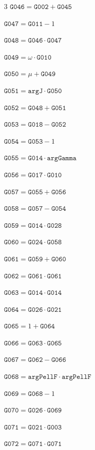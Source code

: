 \documentclass[10pt]{article}
\begin{document}
\begin{multicols}{3}
\noindent $\mathtt{G046}=\mathtt{G002}+\mathtt{G045}$\par
\noindent $\mathtt{G047}=\mathtt{G011}-1$\par
\noindent $\mathtt{G048}=\mathtt{G046}\cdot \mathtt{G047}$\par
\noindent $\mathtt{G049}=\omega\cdot \mathtt{G010}$\par
\noindent $\mathtt{G050}=\mu+\mathtt{G049}$\par
\noindent $\mathtt{G051}=\mathtt{argJ}\cdot \mathtt{G050}$\par
\noindent $\mathtt{G052}=\mathtt{G048}+\mathtt{G051}$\par
\noindent $\mathtt{G053}=\mathtt{G018}-\mathtt{G052}$\par
\noindent $\mathtt{G054}=\mathtt{G053}-1$\par
\noindent $\mathtt{G055}=\mathtt{G014}\cdot \mathtt{argGamma}$\par
\noindent $\mathtt{G056}=\mathtt{G017}\cdot \mathtt{G010}$\par
\noindent $\mathtt{G057}=\mathtt{G055}+\mathtt{G056}$\par
\noindent $\mathtt{G058}=\mathtt{G057}-\mathtt{G054}$\par
\noindent $\mathtt{G059}=\mathtt{G014}\cdot \mathtt{G028}$\par
\noindent $\mathtt{G060}=\mathtt{G024}\cdot \mathtt{G058}$\par
\noindent $\mathtt{G061}=\mathtt{G059}+\mathtt{G060}$\par
\noindent $\mathtt{G062}=\mathtt{G061}\cdot \mathtt{G061}$\par
\noindent $\mathtt{G063}=\mathtt{G014}\cdot \mathtt{G014}$\par
\noindent $\mathtt{G064}=\mathtt{G026}\cdot \mathtt{G021}$\par
\noindent $\mathtt{G065}=1+\mathtt{G064}$\par
\noindent $\mathtt{G066}=\mathtt{G063}\cdot \mathtt{G065}$\par
\noindent $\mathtt{G067}=\mathtt{G062}-\mathtt{G066}$\par
\noindent $\mathtt{G068}=\mathtt{argPellF}\cdot \mathtt{argPellF}$\par
\noindent $\mathtt{G069}=\mathtt{G068}-1$\par
\noindent $\mathtt{G070}=\mathtt{G026}\cdot \mathtt{G069}$\par
\noindent $\mathtt{G071}=\mathtt{G021}\cdot \mathtt{G003}$\par
\noindent $\mathtt{G072}=\mathtt{G071}\cdot \mathtt{G071}$\par

\end{multicols}
\end{document}
